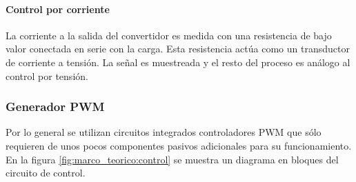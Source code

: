 \paragraph{Control por corriente}
La corriente a la salida del convertidor es medida con una resistencia de bajo valor conectada en serie con la carga.
Esta resistencia actúa como un transductor de corriente a tensión.
La señal es muestreada y el resto del proceso es análogo al control por tensión.\\



\subsubsection{Generador PWM}

Por lo general se utilizan circuitos integrados controladores PWM que sólo requieren de unos pocos componentes pasivos adicionales para su funcionamiento. 
En la figura \ref{fig:marco_teorico:control} se muestra un diagrama en bloques del circuito de control.

